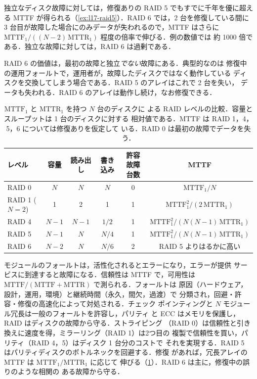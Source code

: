 \documentclass[../main.tex]{subfiles}
\begin{document}
独立なディスク故障に対しては，修復ありの RAID 5 でもすでに千年を優に超える
MTTF が得られる（\cref{ex:l17-raid5}）．RAID 6 では，2 台を修復している間に
3 台目が故障した場合にのみデータが失われるので，MTTF はさらに
$\mathrm{MTTF}_1/((N-2)\,\mathrm{MTTR}_1)$ 程度の倍率で伸びる．例の数値では
約 1000 倍である．独立な故障に対しては，RAID 6 は過剰である．

RAID 6 の価値は，最初の故障と独立\emph{でない}故障にある．典型的なのは
修復中の運用フォールトで，運用者が，故障したディスクではなく動作している
ディスクを交換してしまう場合である．RAID 5 のアレイはこれで 2 台を失い，
データも失われる．RAID 6 のアレイは動作し続け，なお修復できる．

\begin{table}[htbp]
  \centering\small
  \caption{$\mathrm{MTTF}_1$ と $\mathrm{MTTR}_1$ を持つ $N$ 台のディスクに
    よる RAID レベルの比較．容量とスループットは 1 台のディスクに対する
    相対値である．MTTF は RAID 1，4，5，6 については修復ありを仮定して
    いる．RAID 0 は最初の故障でデータを失う．}
  \label{tab:l17-raid}
  \setlength{\tabcolsep}{4pt}
  \begin{tabular}{@{}lccccc@{}}
    \toprule
    レベル & 容量 & 読み出し & 書き込み & 許容故障台数 & MTTF \\
    \midrule
    RAID 0 & $N$   & $N$   & $N$   & 0 & $\mathrm{MTTF}_1/N$ \\
    RAID 1 ($N=2$) & 1 & 2 & 1   & 1 & $\mathrm{MTTF}_1^2/(2\,\mathrm{MTTR}_1)$ \\
    RAID 4 & $N-1$ & $N-1$ & $1/2$ & 1 & $\mathrm{MTTF}_1^2/(N(N-1)\,\mathrm{MTTR}_1)$ \\
    RAID 5 & $N-1$ & $N$   & $N/4$ & 1 & $\mathrm{MTTF}_1^2/(N(N-1)\,\mathrm{MTTR}_1)$ \\
    RAID 6 & $N-2$ & $N$   & $N/6$ & 2 & RAID 5 よりはるかに高い \\
    \bottomrule
  \end{tabular}
\end{table}

\begin{keypoint}[章のまとめ]
  モジュールのフォールトは，活性化されるとエラーになり，エラーが提供
  サービスに到達すると故障になる．信頼性は MTTF で，可用性は
  $\mathrm{MTTF}/(\mathrm{MTTF}+\mathrm{MTTR})$ で測られる．フォールトは
  原因（ハードウェア，設計，運用，環境）と継続時間（永久，間欠，過渡）で
  分類され，回避・許容・修復の高速化によって対処される．チェック
  ポインティングと $N$ モジュール冗長は一般のフォールトを許容し，パリティ
  と ECC はメモリを保護し，RAID はディスクの故障から守る．ストライピング
  （RAID 0）は信頼性と引き換えに速度を得，ミラーリング（RAID 1）は2つ目の
  複製で信頼性を買い，パリティ（RAID 4，5）はディスク 1 台分のコストで
  それを実現する．RAID 5 はパリティディスクのボトルネックを回避する．修復
  があれば，冗長アレイの MTTF は $\mathrm{MTTF}_1/\mathrm{MTTR}_1$ に応じて
  伸びる（\cref{tab:l17-raid}）．RAID 6 は主に，修復中の誤りのような相関の
  ある故障から守る．
\end{keypoint}
\end{document}
